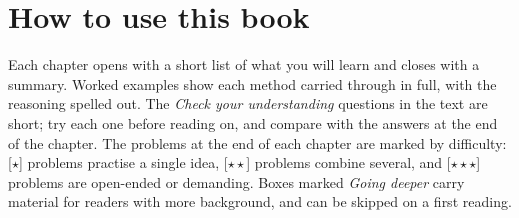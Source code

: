\section*{How to use this book}

Each chapter opens with a short list of what you will learn and closes with a
summary. Worked examples show each method carried through in full, with the
reasoning spelled out. The \emph{Check your understanding} questions in the
text are short; try each one before reading on, and compare with the answers
at the end of the chapter. The problems at the end of each chapter are marked
by difficulty: [$\star$] problems practise a single idea, [$\star\star$]
problems combine several, and [$\star\star\star$] problems are open-ended or
demanding. Boxes marked \emph{Going deeper} carry material for readers with
more background, and can be skipped on a first reading.
